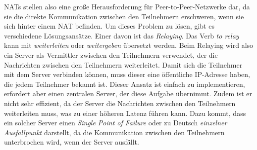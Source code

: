 NATs stellen also eine große Herausforderung für Peer-to-Peer-Netzwerke dar, da sie die direkte Kommunikation zwischen den Teilnehmern erschweren, wenn sie sich hinter einem NAT befinden. Um dieses Problem zu lösen, gibt es verschiedene Lösungsansätze. Einer davon ist das \textit{Relaying}. Das Verb \textit{to relay} kann mit \textit{weiterleiten} oder \textit{weitergeben} übersetzt werden. Beim Relaying wird also ein Server als Vermittler zwischen den Teilnehmern verwendet, der die Nachrichten zwischen den Teilnehmern weiterleitet. Damit sich die Teilnehmer mit dem Server verbinden können, muss dieser eine öffentliche IP-Adresse haben, die jedem Teilnehmer bekannt ist. Dieser Ansatz ist einfach zu implementieren, erfordert aber einen zentralen Server, der diese Aufgabe übernimmt. Zudem ist er nicht sehr effizient, da der Server die Nachrichten zwischen den Teilnehmern weiterleiten muss, was zu einer höheren Latenz führen kann. Dazu kommt, dass ein solcher Server einen \textit{Single Point of Failure} oder zu Deutsch \textit{einzelner Ausfallpunkt} darstellt, da die Kommunikation zwischen den Teilnehmern unterbrochen wird, wenn der Server ausfällt.

